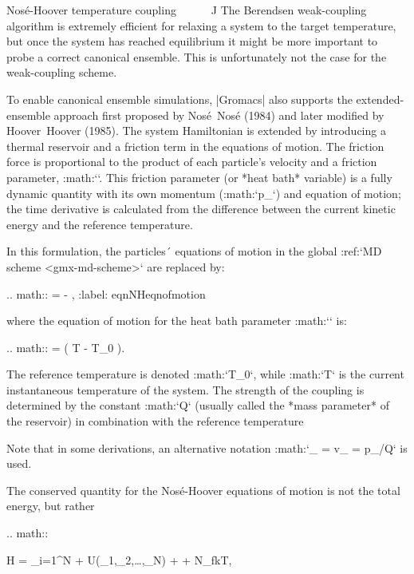 Nosé-Hoover temperature coupling
^^^^^^^^^^^^^^^^^^^^^^^^^^^^^^^^

The Berendsen weak-coupling algorithm is extremely efficient for
relaxing a system to the target temperature, but once the system has
reached equilibrium it might be more important to probe a correct
canonical ensemble. This is unfortunately not the case for the
weak-coupling scheme.

To enable canonical ensemble simulations, |Gromacs| also supports the
extended-ensemble approach first proposed by Nosé Nosé (1984) and later
modified by Hoover Hoover (1985). The system Hamiltonian is extended by
introducing a thermal reservoir and a friction term in the equations of
motion. The friction force is proportional to the product of each
particle’s velocity and a friction parameter, :math:`\xi`. This friction
parameter (or *heat bath* variable) is a fully dynamic quantity with its
own momentum (:math:`p_{\xi}`) and equation of motion; the time
derivative is calculated from the difference between the current kinetic
energy and the reference temperature.

In this formulation, the particles´ equations of motion in
the global :ref:`MD scheme <gmx-md-scheme>` are replaced by:

.. math::  =  - 
          \frac{p_{\xi}}{Q}\frac{{\mbox{d}}{\mbox{\boldmath ${r}$}}_i}{{\mbox{d}}t} ,
          :label: eqnNHeqnofmotion

where the equation of motion for the heat bath parameter :math:`\xi` is:

.. math::  = \left( T - T_0 \right).

The reference temperature is denoted :math:`T_0`, while :math:`T` is
the current instantaneous temperature of the system. The strength of the
coupling is determined by the constant :math:`Q` (usually called the
*mass parameter* of the reservoir) in combination with the reference
temperature

Note that in some
derivations, an alternative notation
:math:`\xi_{} = v_{\xi} = p_{\xi}/Q` is used.

The conserved quantity for the Nosé-Hoover equations of motion is not
the total energy, but rather

.. math::

   \begin{aligned}
   H = \sum_{i=1}^{N}  + U\left({{{\mbox{}}}}_1,{{{\mbox{}}}}_2,\ldots,{{{\mbox{}}}}_N\right) + + N_fkT\xi,\end{aligned}

